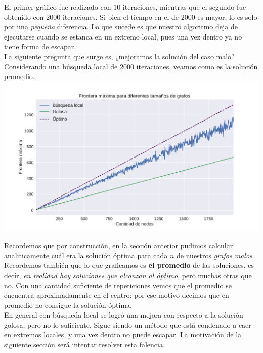 El primer gráfico fue realizado con $10$ iteraciones, mientras que el segundo fue obtenido con $2000$ iteraciones. Si bien el tiempo en el de $2000$ es mayor, lo es solo por una \textit{pequeña} diferencia. Lo que sucede es que nuestro algoritmo deja de ejecutarse cuando se estanca en un extremo local, pues una vez dentro ya no tiene forma de escapar. \\

La siguiente pregunta que surge es, ¿mejoramos la solución del caso malo? Considerando una búsqueda local de 2000 iteraciones, veamos como es la solución promedio. \\

{\centering
    \includegraphics[width=1\textwidth]{informe/imgs/exp_malo_frontera_greedy_local_2000_optimo.pdf}
}

Recordemos que por construcción, en la sección anterior pudimos calcular analiticamente cuál era la solución óptima para cada $n$ de nuestros \textit{grafos malos}. Recordemos también que lo que graficamos es \textbf{el promedio} de las soluciones, es decir, \textit{en realidad hay soluciones que alcanzan al óptimo}, pero muchas otras que no. Con una cantidad suficiente de repeticiones vemos que el promedio se encuentra aproximadamente en el centro: por ese motivo decimos que en promedio no consigue la solución óptima. \\

En general con búsqueda local se logró una mejora con respecto a la solución golosa, pero no lo suficiente. Sigue siendo un método que está condenado a caer en extremos locales, y una vez dentro no puede escapar. La motivación de la siguiente sección será intentar resolver esta falencia.
